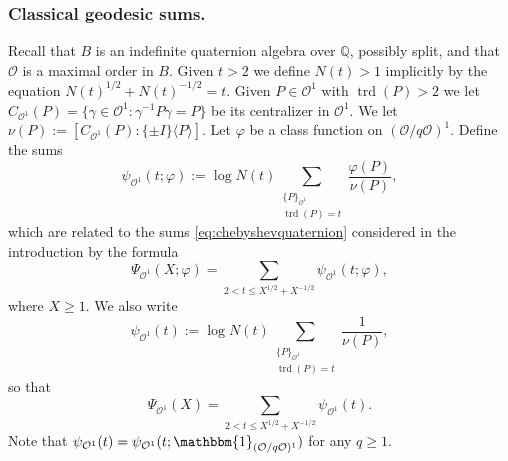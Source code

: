 \documentclass{article}
\theoremstyle{named}
\newcommand{\Q}{\mathbb{Q}}
\renewcommand{\O}{\mathcal{O}}
\DeclareMathOperator{\trd}{trd}
\begin{document}
\subsubsection{Classical geodesic sums.}
Recall that $B$ is an indefinite quaternion algebra over $\Q$, possibly split, and that $\O$ is a maximal order in $B$. Given $t > 2$ we define $N(t) > 1$ implicitly by the equation $N(t)^{1/2} + N(t)^{-1/2} = t$. Given $P \in \O^1$ with $\trd(P) > 2$ we let $C_{\O^1}(P) = \{\gamma \in \O^1 : \gamma^{-1}P\gamma = P\}$ be its centralizer in $\O^1$. We let $\nu(P) := [C_{\O^1}(P): \{\pm I\}\langle P\rangle]$. Let $\varphi$ be a class function on $(\O/q\O)^1$. Define the sums
\begin{equation}\label{eq:chebyshevfixedtrace}
    \psi_{\O^1}(t; \varphi) := \log N(t)\sum_{\substack{\{P\}_{\O^1}\\
    \trd(P) = t}} \frac{\varphi(P)}{\nu(P)},
\end{equation}
which are related to the sums \eqref{eq:chebyshevquaternion} considered in the introduction by the formula
\begin{equation}\label{eq:chebyshevsumoftraces}
    \Psi_{\O^1}(X; \varphi) = \sum_{2 < t \leq X^{1/2} + X^{-1/2}} \psi_{\O^1}(t; \varphi),
\end{equation}
where $X \geq 1$. We also write 
\begin{equation}\label{eq:untwistedchebyshevfixedtrace}
    \psi_{\O^1}(t) := \log N(t)\sum_{\substack{\{P\}_{\O^1}\\
    \trd(P) = t}} \frac{1}{\nu(P)},
\end{equation}
so that 
\begin{equation*}
    \Psi_{\O^1}(X) = \sum_{2 < t \leq X^{1/2} + X^{-1/2}} \psi_{\O^1}(t).
\end{equation*}
Note that $\psi_{\O^1}(t) = \psi_{\O^1}(t; \mathbbm{1}_{(\O/q\O)^1})$ for any $q \geq 1$.
\end{document}
